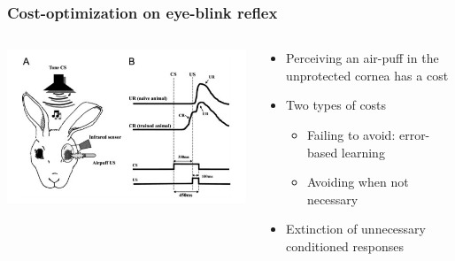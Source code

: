 \documentclass[10pt, compress]{beamer}
\begin{document}
\begin{frame}[fragile]
  \frametitle{Cost-optimization on eye-blink reflex}
  \begin{columns}[T]
    \begin{column}[T]{5cm}
      \includegraphics[scale=0.3]{images/eyeblink.png}
    \end{column}
    \begin{column}[T]{5cm}
      \begin{itemize}
        \item Perceiving an air-puff in the unprotected cornea has a cost
        \item Two types of costs
        \begin{itemize}
          \item Failing to avoid: error-based learning
          \item Avoiding when not necessary
        \end{itemize}
        \item Extinction of unnecessary conditioned responses
      \end{itemize}
      \cite{Herreros2013b}
    \end{column}
  \end{columns}
\end{frame}
\end{document}
